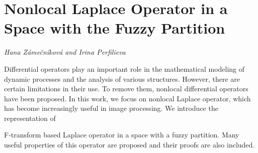 \documentclass[../booklet.tex]{subfiles}
\begin{document}
\section[Nonlocal Laplace Operator in a Space with the Fuzzy Partition. {\it Hana Zámečníková and Irina Perfilieva}]{Nonlocal Laplace Operator in a Space with the Fuzzy Partition}
 

\begin{center}
  {\it Hana Zámečníková and Irina Perfilieva}
\end{center}

\vskip 0.8cm


Differential operators play an important role in the mathematical modeling of dynamic processes and the analysis of various structures. However, there are certain limitations in their use. To remove them, nonlocal differential operators have been proposed. In this work, we focus on nonlocal Laplace operator, which has become increasingly useful in image processing. We introduce the representation of 

F-transform based Laplace operator in a space with a fuzzy partition. Many useful properties of this operator are proposed and their proofs are also included.


\end{document}

